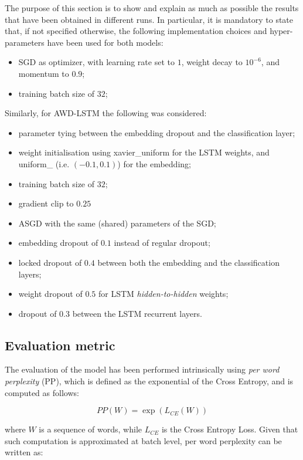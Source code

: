 The purpose of this section is to show and explain as much as possible the results that have been obtained in different runs. In particular, it is mandatory to state that, if not specified otherwise, the following implementation choices and hyper-parameters have been used for both models:
\begin{itemize}
    \item SGD as optimizer, with learning rate set to $1$, weight decay to $10^{-6}$, and momentum to $0.9$;
    \item training batch size of $32$;
\end{itemize}
Similarly, for AWD-LSTM the following was considered:
\begin{itemize}
    \item parameter tying between the embedding dropout and the classification layer;
    \item weight initialisation using xavier\_uniform for the LSTM weights, and uniform\_ (i.e. $(-0.1, 0.1)$) for the embedding;
    \item training batch size of $32$;
    \item gradient clip to $0.25$
    \item ASGD with the same (shared) parameters of the SGD;
    \item embedding dropout of $0.1$ instead of regular dropout;
    \item locked dropout of $0.4$ between both the embedding and the classification layers;
    \item weight dropout of $0.5$ for LSTM \textit{hidden-to-hidden} weights;
    \item dropout of $0.3$ between the LSTM recurrent layers.
\end{itemize}

\subsection{Evaluation metric}
The evaluation of the model has been performed intrinsically using \textit{per word perplexity} (PP), which is defined as the exponential of the Cross Entropy, and is computed as follows:

\begin{equation}
    PP(W) = \exp{(L_{CE}(W))}
\end{equation}

where $W$ is a sequence of words, while $L_{CE}$ is the Cross Entropy Loss. Given that such computation is approximated at batch level, per word perplexity can be written as:

